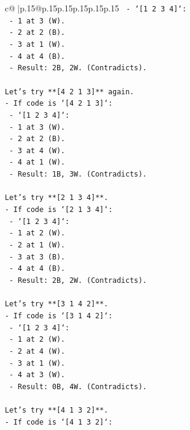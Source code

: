 \documentclass{article}
\begin{document}
{\begin{supertabular}{c@{$\;$}|p{.15\linewidth}@{}p{.15\linewidth}p{.15\linewidth}p{.15\linewidth}p{.15\linewidth}p{.15\linewidth}}
{{{\texttt{  {-} `{[}1 2 3 4{]}`:} \\
\texttt{    {-} 1 at 3 (W).} \\
\texttt{    {-} 2 at 2 (B).} \\
\texttt{    {-} 3 at 1 (W).} \\
\texttt{    {-} 4 at 4 (B).} \\
\texttt{    {-} Result: 2B, 2W. (Contradicts).} \\
\\ 
\texttt{Let's try **{[}4 2 1 3{]}** again.} \\
\texttt{{-} If code is `{[}4 2 1 3{]}`:} \\
\texttt{  {-} `{[}1 2 3 4{]}`:} \\
\texttt{    {-} 1 at 3 (W).} \\
\texttt{    {-} 2 at 2 (B).} \\
\texttt{    {-} 3 at 4 (W).} \\
\texttt{    {-} 4 at 1 (W).} \\
\texttt{    {-} Result: 1B, 3W. (Contradicts).} \\
\\ 
\texttt{Let's try **{[}2 1 3 4{]}**.} \\
\texttt{{-} If code is `{[}2 1 3 4{]}`:} \\
\texttt{  {-} `{[}1 2 3 4{]}`:} \\
\texttt{    {-} 1 at 2 (W).} \\
\texttt{    {-} 2 at 1 (W).} \\
\texttt{    {-} 3 at 3 (B).} \\
\texttt{    {-} 4 at 4 (B).} \\
\texttt{    {-} Result: 2B, 2W. (Contradicts).} \\
\\ 
\texttt{Let's try **{[}3 1 4 2{]}**.} \\
\texttt{{-} If code is `{[}3 1 4 2{]}`:} \\
\texttt{  {-} `{[}1 2 3 4{]}`:} \\
\texttt{    {-} 1 at 2 (W).} \\
\texttt{    {-} 2 at 4 (W).} \\
\texttt{    {-} 3 at 1 (W).} \\
\texttt{    {-} 4 at 3 (W).} \\
\texttt{    {-} Result: 0B, 4W. (Contradicts).} \\
\\ 
\texttt{Let's try **{[}4 1 3 2{]}**.} \\
\texttt{{-} If code is `{[}4 1 3 2{]}`:} \\
}}}
\end{supertabular}}
\end{document}
